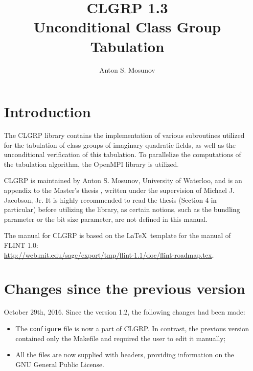 \documentclass[a4paper,10pt]{article}
\title{CLGRP 1.3\\Unconditional Class Group Tabulation}
\author{Anton S. Mosunov}
\newcommand{\code}{\lstinline}
\begin{document}
\maketitle
\tableofcontents
\lstset{language=c}
\lstset{basicstyle=\ttfamily}
\lstset{keywordstyle=}
\lstset{escapeinside=\%\%}





\section{Introduction}

The CLGRP library contains the implementation of various subroutines utilized for the tabulation of class groups of imaginary quadratic fields, as well as the unconditional verification of this tabulation. To parallelize the computations of the tabulation algorithm, the OpenMPI library is utilized.

CLGRP is maintained by Anton S. Mosunov, University of Waterloo, and is an appendix to the Master's thesis \cite{mosunov}, written under the supervision of Michael J. Jacobson, Jr. It is highly recommended to read the thesis (Section 4 in particular) before utilizing the library, as certain notions, such as the bundling parameter or the bit size parameter, are not defined in this manual.

The manual for CLGRP is based on the \LaTeX \, template for the manual of FLINT 1.0:\\\url{http://web.mit.edu/sage/export/tmp/flint-1.1/doc/flint-roadmap.tex}.





\section{Changes since the previous version}

October 29th, 2016. Since the version 1.2, the following changes had been made:

\begin{itemize}
\item The \code{configure} file is now a part of CLGRP. In contrast, the previous version contained only the Makefile and required the user to edit it manually;
\item All the files are now supplied with headers, providing information on the GNU General Public License.
\end{itemize}
\end{document}
